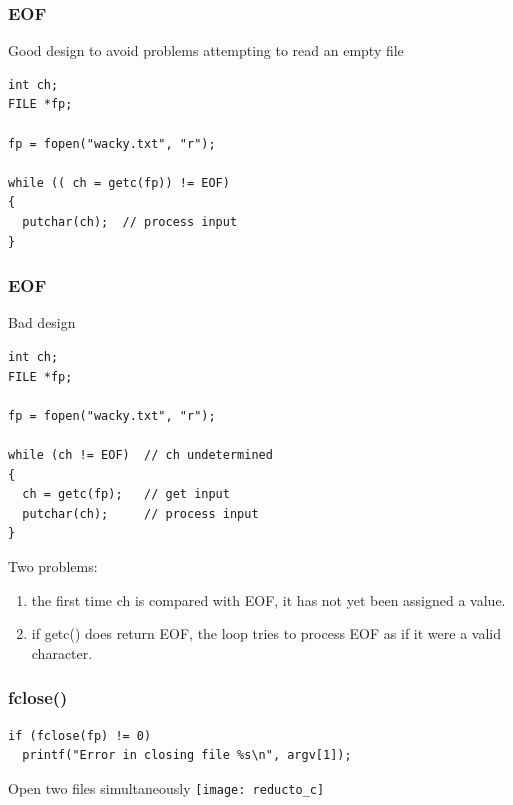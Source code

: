 \documentclass[hyperref={xetex,colorlinks,linkcolor=blue},green,compress]{beamer}
\begin{document}
\begin{frame}[fragile]
  \frametitle{EOF}
  \begin{exampleblock}{Good design to avoid problems attempting to read an empty
      file}
    \begin{lstlisting}
int ch;
FILE *fp;

fp = fopen("wacky.txt", "r");

while (( ch = getc(fp)) != EOF)
{
  putchar(ch);  // process input
}
\end{lstlisting}
  \end{exampleblock}
\end{frame}

\begin{frame}[fragile]
  \frametitle{EOF}
  \begin{exampleblock}{Bad design}
    \begin{lstlisting}
int ch;
FILE *fp;

fp = fopen("wacky.txt", "r");

while (ch != EOF)  // ch undetermined 
{
  ch = getc(fp);   // get input
  putchar(ch);     // process input
}
 \end{lstlisting}
  \end{exampleblock}
  Two problems:
  \begin{enumerate}
  \item the first time ch is compared with EOF, it has not yet been
    assigned a value.
  \item if getc() does return EOF, the loop tries to process EOF as if
    it were a valid character.
  \end{enumerate}
\end{frame}

\begin{frame}[fragile]
  \frametitle{fclose()}
  \begin{exampleblock}{}
    \begin{lstlisting}
if (fclose(fp) != 0)
  printf("Error in closing file %s\n", argv[1]);
    \end{lstlisting}
  \end{exampleblock}
\end{frame}

\begin{frame}
  \begin{exampleblock}{Open two files simultaneously}
    \texttt{[image: reducto\_c]}
  \end{exampleblock}
\end{frame}
\end{document}

